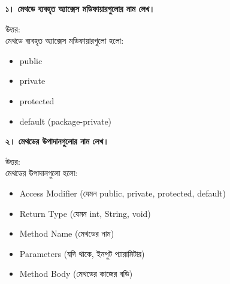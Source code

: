 \documentclass[12pt]{article}
\begin{document}
\textbf{১। মেথডে ব্যবহৃত অ্যাক্সেস মডিফায়ারগুলোর নাম লেখ।}

উত্তর:  \\
মেথডে ব্যবহৃত অ্যাক্সেস মডিফায়ারগুলো হলো:

\begin{itemize}
    \item public
    \item private
    \item protected
    \item default (package-private)
\end{itemize}

\vspace{0.5em}
\textbf{২। মেথডের উপাদানগুলোর নাম লেখ।}

উত্তর:  \\
মেথডের উপাদানগুলো হলো:

\begin{itemize}
    \item Access Modifier (যেমন public, private, protected, default)
    \item Return Type (যেমন int, String, void)
    \item Method Name (মেথডের নাম)
    \item Parameters (যদি থাকে, ইনপুট প্যারামিটার)
    \item Method Body (মেথডের কাজের বডি)
\end{itemize}

\end{document}
